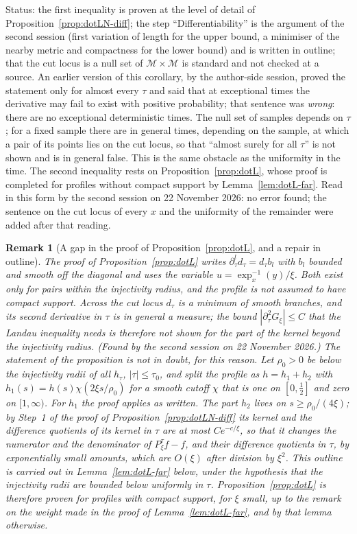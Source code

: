 \documentclass[11pt,a4paper]{article}
\theoremstyle{stmt}
\theoremstyle{defn}
\theoremstyle{rmk}
\newtheorem{remark}[theorem]{Remark}
\numberwithin{equation}{section}
\newcommand{\status}[1]{\par\noindent\textsf{\small Status: #1}\par}
\newcommand{\M}{\mathcal{M}}
\begin{document}
{\status{the first inequality is proven at the level of detail of Proposition~\ref{prop:dotLN-diff}; the step ``Differentiability'' is the argument of the second session (first variation of length for the upper bound, a minimiser of the nearby metric and compactness for the lower bound) and is written in outline; that the cut locus is a null set of $\M\times\M$ is standard and not checked at a source. An earlier version of this corollary, by the author-side session, proved the statement only for almost every $\tau$ and said that at exceptional times the derivative may fail to exist with positive probability; that sentence was \emph{wrong}: there are no exceptional deterministic times. The null set of samples depends on $\tau$; for a fixed sample there are in general times, depending on the sample, at which a pair of its points lies on the cut locus, so that ``almost surely for all $\tau$'' is not shown and is in general false. This is the same obstacle as the uniformity in the time. The second inequality rests on Proposition~\ref{prop:dotL}, whose proof is completed for profiles without compact support by Lemma~\ref{lem:dotL-far}. Read in this form by the second session on 22 November 2026: no error found; the sentence on the cut locus of every $x$ and the uniformity of the remainder were added after that reading.}

\begin{remark}[A gap in the proof of Proposition~\ref{prop:dotL}, and a repair in outline]\label{rem:dotL-far}
The proof of Proposition~\ref{prop:dotL} writes $\partial_\tau^ld_\tau=d_\tau b_l$ with $b_l$ bounded and smooth off the diagonal and uses the variable $u=\exp_x^{-1}(y)/\xi$. Both exist only for pairs within the injectivity radius, and the profile is not assumed to have compact support. Across the cut locus $d_\tau$ is a minimum of smooth branches, and its second derivative in $\tau$ is in general a measure; the bound $|\partial_\tau^2G_\xi|\le C$ that the Landau inequality needs is therefore not shown for the part of the kernel beyond the injectivity radius. (Found by the second session on 22 November 2026.) The statement of the proposition is not in doubt, for this reason. Let $\rho_0>0$ be below the injectivity radii of all $h_\tau$, $|\tau|\le\tau_0$, and split the profile as $h=h_1+h_2$ with $h_1(s)=h(s)\chi(2\xi s/\rho_0)$ for a smooth cutoff $\chi$ that is one on $[0,\frac12]$ and zero on $[1,\infty)$. For $h_1$ the proof applies as written. The part $h_2$ lives on $s\ge\rho_0/(4\xi)$; by Step~1 of the proof of Proposition~\ref{prop:dotLN-diff} its kernel and the difference quotients of its kernel in $\tau$ are at most $Ce^{-c/\xi}$, so that it changes the numerator and the denominator of $P^\tau_\xi f-f$, and their difference quotients in $\tau$, by exponentially small amounts, which are $O(\xi)$ after division by $\xi^2$. This outline is carried out in Lemma~\ref{lem:dotL-far} below, under the hypothesis that the injectivity radii are bounded below uniformly in $\tau$. Proposition~\ref{prop:dotL} is therefore proven for profiles with compact support, for $\xi$ small, up to the remark on the weight made in the proof of Lemma~\ref{lem:dotL-far}, and by that lemma otherwise.
\end{remark}

}
\end{document}
